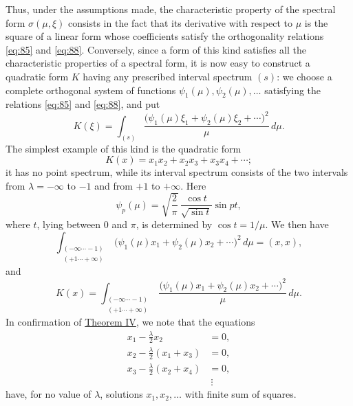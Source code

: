 \documentclass[b5paper,twoside]{article}
\newcommand{\originalpage}[1]{\phantomsection\label{origpage:#1}}
\begin{document}
Thus, under the assumptions made, the characteristic property of the
spectral form $\sigma(\mu,\xi)$ consists in the fact that its derivative with
respect to $\mu$ is the square of a linear form whose coefficients satisfy
the orthogonality relations \eqref{eq:85} and \eqref{eq:88}. Conversely,
since a form of this kind satisfies all the characteristic properties of a
spectral form, it is now easy to construct a quadratic form $K$ having any
prescribed interval spectrum $(s)$: we choose a complete orthogonal system of functions
$\psi_1(\mu),\psi_2(\mu),\ldots$ satisfying the relations \eqref{eq:85} and
\eqref{eq:88}, and put
\[
  K(\xi)=\int_{(s)}
  \frac{\bigl(\psi_1(\mu)\xi_1+\psi_2(\mu)\xi_2+\cdots\bigr)^2}{\mu}
  \,d\mu.
\]
The simplest example of this kind is the quadratic form
\begin{equation}
  K(x)=x_1x_2+x_2x_3+x_3x_4+\cdots;
  \tag{90}\label{eq:90}
\end{equation}
it has no point spectrum, while its interval spectrum
\originalpage{208}
consists of the two intervals from $\lambda=-\infty$ to $-1$ and from
$+1$ to $+\infty$. Here
\[
  \psi_p(\mu)=\sqrt{\frac{2}{\pi}}\,
  \frac{\cos t}{\sqrt{\sin t}}\sin pt,
\]
where $t$, lying between $0$ and $\pi$, is determined by
$\cos t=1/\mu$. We then have
\[
  \int_{\substack{(-\infty\cdots-1)\\(+1\cdots+\infty)}}
  \bigl(\psi_1(\mu)x_1+\psi_2(\mu)x_2+\cdots\bigr)^2\,d\mu
  =(x,x),
\]
and
\[
  K(x)=
  \int_{\substack{(-\infty\cdots-1)\\(+1\cdots+\infty)}}
  \frac{\bigl(\psi_1(\mu)x_1+\psi_2(\mu)x_2+\cdots\bigr)^2}{\mu}
  \,d\mu.
\]
In confirmation of \hyperref[thm:IV]{Theorem IV}, we note that the equations
\begin{align*}
  x_1-\frac{\lambda}{2}x_2&=0,\\
  x_2-\frac{\lambda}{2}(x_1+x_3)&=0,\\
  x_3-\frac{\lambda}{2}(x_2+x_4)&=0,\\
  &\ \vdots
\end{align*}
have, for no value of $\lambda$, solutions
$x_1,x_2,\ldots$ with finite sum of squares.
\end{document}
